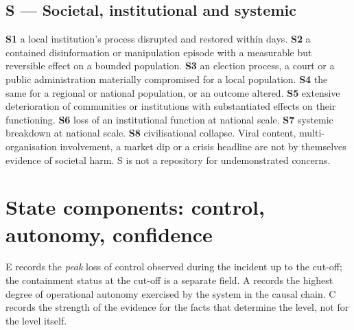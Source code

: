 \documentclass[11pt,a4paper]{article}
\begin{document}
\subsection{S --- Societal, institutional and systemic}
\textbf{S1} a local institution's process disrupted and restored within days. \textbf{S2} a contained disinformation or manipulation episode with a measurable but reversible effect on a bounded population. \textbf{S3} an election process, a court or a public administration materially compromised for a local population. \textbf{S4} the same for a regional or national population, or an outcome altered. \textbf{S5} extensive deterioration of communities or institutions with substantiated effects on their functioning. \textbf{S6} loss of an institutional function at national scale. \textbf{S7} systemic breakdown at national scale. \textbf{S8} civilisational collapse. Viral content, multi-organisation involvement, a market dip or a crisis headline are not by themselves evidence of societal harm. S is not a repository for undemonstrated concerns.

\section{State components: control, autonomy, confidence}
\label{app:state}

E records the \emph{peak} loss of control observed during the incident up to the cut-off; the containment status at the cut-off is a separate field. A records the highest degree of operational autonomy exercised by the system in the causal chain. C records the strength of the evidence for the facts that determine the level, not for the level itself.
\end{document}
